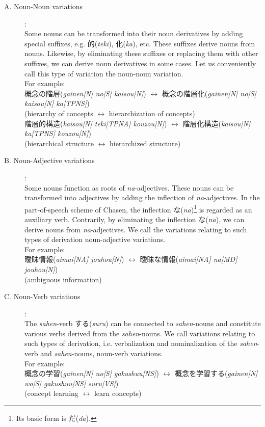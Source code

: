 \begin{description}

\item[A. Noun-Noun variations]:\\
Some nouns can be transformed into their noun derivatives by adding special suffixes, e.g. 的({\it teki}), 化({\it ka}), etc. These suffixes derive nouns from nouns. Likewise, by eliminating these suffixes or replacing them with other suffixes, we can derive noun derivatives in some cases. Let us conveniently call this type of variation the noun-noun variation.\\
For example:\\
概念の階層({\it gainen[N] no[S] kaisou[N]}) $\leftrightarrow$ 概念の階層化({\it gainen[N] no[S] kaisou[N] ka[TPNS]})\\
(hierarchy of concepts $\leftrightarrow$ hierarchization of concepts)\\
階層的構造({\it kaisou[N] teki[TPNA] kouzou[N]}) $\leftrightarrow$ 階層化構造({\it kaisou[N] ka[TPNS] kouzou[N]})\\
(hierarchical structure $\leftrightarrow$ hierarchized structure)\\

\item[B. Noun-Adjective variations]:\\
Some nouns function as roots of {\it na}-adjectives. These nouns can be transformed into adjectives by adding the inflection of {\it na}-adjectives. In the part-of-speech scheme of Chasen, the inflection な({\it na})\footnote{Its basic form is だ({\it da}).} is regarded as an auxiliary verb. Contrarily, by eliminating the inflection な({\it na}), we can derive nouns from {\it na}-adjectives. We call the variations relating to such types of derivation noun-adjective variations.\\
For example:\\
曖昧情報({\it aimai[NA] jouhou[N]}) $\leftrightarrow$ 曖昧な情報({\it aimai[NA] na[MD] jouhou[N]})\\
(ambiguous information)\\

\item[C. Noun-Verb variations]:\\
The {\it sahen}-verb する({\it suru}) can be connected to {\it sahen}-nouns and constitute various verbs derived from the {\it sahen}-nouns. We call variations relating to such types of derivation, i.e. verbalization and nominalization of the {\it sahen}-verb and {\it sahen}-nouns, noun-verb variations.\\
For example:\\
概念の学習({\it gainen[N] no[S] gakushuu[NS]}) $\leftrightarrow$ 概念を学習する({\it gainen[N] wo[S] gakushuu[NS] suru[VS]})\\
(concept learning $\leftrightarrow$ learn concepts)\\

\end{description}

